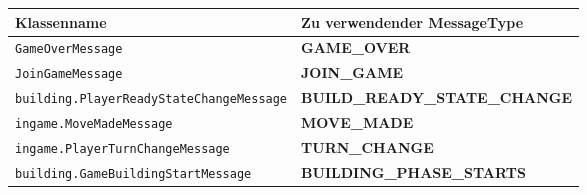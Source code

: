 \documentclass[12pt]{article}
\begin{document}
\begin{center}
\begin{tabular}{|l|l|}
\hline
\textbf{Klassenname} & \textbf{Zu verwendender MessageType} \\
\hline
\texttt{GameOverMessage} & \textbf{GAME\_OVER} \\
\texttt{JoinGameMessage} & \textbf{JOIN\_GAME} \\
\texttt{building.PlayerReadyStateChangeMessage} & \textbf{BUILD\_READY\_STATE\_CHANGE} \\
\texttt{ingame.MoveMadeMessage} & \textbf{MOVE\_MADE} \\
\texttt{ingame.PlayerTurnChangeMessage} & \textbf{TURN\_CHANGE} \\
\texttt{building.GameBuildingStartMessage} & \textbf{BUILDING\_PHASE\_STARTS} \\
\hline
\end{tabular}
\end{center}
\end{document}
